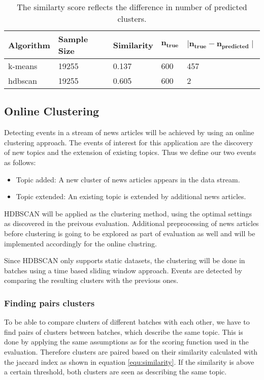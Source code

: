 \begin{table}[h]
    \centering
    \begin{tabular}{|l|l|l|l|l|}
    \hline
    \textbf{Algorithm} & \textbf{Sample Size} & \textbf{Similarity}  & $\mathbf{n_{true}}$ & $\mathbf{ \mid n_{true} - n_{predicted} \mid }$ \\ \hline
    k-means & 19255 & 0.137 & 600 & 457 \\ \hline
    hdbscan & 19255 & 0.605 & 600 & 2 \\ \hline
    \end{tabular}
    \caption{The similarty score reflects the difference in number of predicted clusters.}
    \label{tab:avg_predict_kmeans_example}
\end{table}

\subsection{Online Clustering}

Detecting events in a stream of news articles will be achieved by using an online clustering approach. The events of interest for this application are the discovery of new topics and the extension of existing topics. Thus we define our two events as follows:

\begin{itemize}
    \item Topic added: A new cluster of news articles appears in the data stream.
    \item Topic extended: An existing topic is extended by additional news articles.
\end{itemize}

HDBSCAN will be applied as the clustering method, using the optimal settings as discovered in the preivous evaluation. Additional preprocessing of news articles before clustering is going to be explored as part of evaluation as well and will be implemented accordingly for the online clustring.

Since HDBSCAN only supports static datasets, the clustering will be done in batches using a time based sliding window approach. Events are detected by comparing the resulting clusters with the previous ones.

\subsubsection{Finding pairs clusters}

To be able to compare clusters of different batches with each other, we have to find pairs of clusters between batches, which describe the same topic. This is done by applying the same assumptions as for the scoring function used in the evaluation. Therefore clusters are paired based on their similarity calculated with the jaccard index as shown in equation \ref{equ:similarity}. If the similarity is above a certain threshold, both clusters are seen as describing the same topic.

